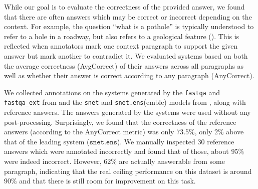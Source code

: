 While our goal is to evaluate the correctness of the provided answer, we found that there are often answers which may be correct or incorrect depending on the context.
For example, the question ``what is a pothole'' is typically understood to refer to a hole in a roadway, but also refers to a geological feature ().
This is reflected when annotators mark one context paragraph to support the given answer but mark another to contradict it.
We evaluated systems based on both the average correctness (AvgCorrect) of their answers across all paragraphs
as well as whether their answer is correct according to any paragraph (AnyCorrect).

We collected annotations on the systems generated by the \texttt{fastqa} and
\texttt{fastqa\_ext} from \citet{weissenborn2017fastqa} and the \texttt{snet} and \texttt{snet.ens}(emble) models from \citet{tan2018s}, along with reference answers.
The answers generated by the systems were used without any post-processing.
Surprisingly, we found that the correctness of the reference answers (according to the AnyCorrect metric) was only 73.5\%,
only 2\% above that of the leading system ($\texttt{snet.ens}$).
We manually inspected 30 reference answers which were annotated incorrectly and found that of those, 
about 95\% were indeed incorrect.
However, 62\% are actually answerable from some paragraph,
indicating that the real ceiling performance on this dataset is around 90\% and
that there is still room for improvement on this task.
